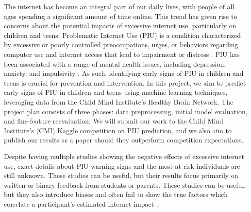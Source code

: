 \documentclass[11pt]{extarticle}
\begin{document}
    The internet has become an integral part of our daily lives, with people of all ages spending a significant amount of time online. 
    This trend has given rise to concerns about the potential impacts of excessive internet use, particularly on children and teens.
    Problematic Internet Use (PIU) is a condition characterized by excessive or poorly controlled preoccupations, urges, or behaviors regarding computer use and internet access that lead to impairment or distress \cite{Pettorruso2020-qt}. 
    PIU has been associated with a range of mental health issues, including depression, anxiety, and impulsivity \cite{Cash2012-rb}.
    As such, identifying early signs of PIU in children and teens is crucial for prevention and intervention.
    In this project, we aim to predict early signs of PIU in children and teens using machine learning techniques, leveraging data from the Child Mind Institute's Healthy Brain Network.
    The project plan consists of three phases: data preprocessing, initial model evaluation, and fine-feature reevaluation.
    We will submit our work to the Child Mind Institute's (CMI) Kaggle competition on PIU prediction, and we also aim to publish our results as a paper should they outperform competition expectations.

    Despite having multiple studies showing the negative effects of excessive internet use, exact details about PIU warning signs and the most at-risk individuals are still unknown.
    These studies can be useful, but their results focus primarily on written or binary feedback from students or parents. 
    These studies can be useful, but they also introduce biases and often fail to show the true factors which correlate a participant's estimated internet impact \cite{Restrepo2020-pb,Aboujaoude2010-mc}.



\end{document}

